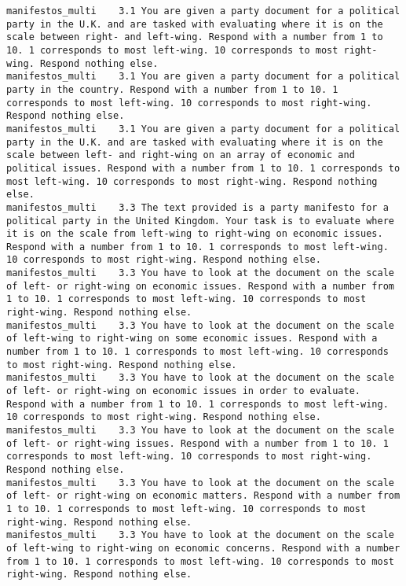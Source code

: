 \begin{lstlisting}[label=lst:promptvariants]
manifestos_multi	3.1	You are given a party document for a political party in the U.K. and are tasked with evaluating where it is on the scale between right- and left-wing. Respond with a number from 1 to 10. 1 corresponds to most left-wing. 10 corresponds to most right-wing. Respond nothing else.
manifestos_multi	3.1	You are given a party document for a political party in the country. Respond with a number from 1 to 10. 1 corresponds to most left-wing. 10 corresponds to most right-wing. Respond nothing else.
manifestos_multi	3.1	You are given a party document for a political party in the U.K. and are tasked with evaluating where it is on the scale between left- and right-wing on an array of economic and political issues. Respond with a number from 1 to 10. 1 corresponds to most left-wing. 10 corresponds to most right-wing. Respond nothing else.
manifestos_multi	3.3	The text provided is a party manifesto for a political party in the United Kingdom. Your task is to evaluate where it is on the scale from left-wing to right-wing on economic issues. Respond with a number from 1 to 10. 1 corresponds to most left-wing. 10 corresponds to most right-wing. Respond nothing else.
manifestos_multi	3.3	You have to look at the document on the scale of left- or right-wing on economic issues. Respond with a number from 1 to 10. 1 corresponds to most left-wing. 10 corresponds to most right-wing. Respond nothing else.
manifestos_multi	3.3	You have to look at the document on the scale of left-wing to right-wing on some economic issues. Respond with a number from 1 to 10. 1 corresponds to most left-wing. 10 corresponds to most right-wing. Respond nothing else.
manifestos_multi	3.3	You have to look at the document on the scale of left- or right-wing on economic issues in order to evaluate. Respond with a number from 1 to 10. 1 corresponds to most left-wing. 10 corresponds to most right-wing. Respond nothing else.
manifestos_multi	3.3	You have to look at the document on the scale of left- or right-wing issues. Respond with a number from 1 to 10. 1 corresponds to most left-wing. 10 corresponds to most right-wing. Respond nothing else.
manifestos_multi	3.3	You have to look at the document on the scale of left- or right-wing on economic matters. Respond with a number from 1 to 10. 1 corresponds to most left-wing. 10 corresponds to most right-wing. Respond nothing else.
manifestos_multi	3.3	You have to look at the document on the scale of left-wing to right-wing on economic concerns. Respond with a number from 1 to 10. 1 corresponds to most left-wing. 10 corresponds to most right-wing. Respond nothing else.

\end{lstlisting}
